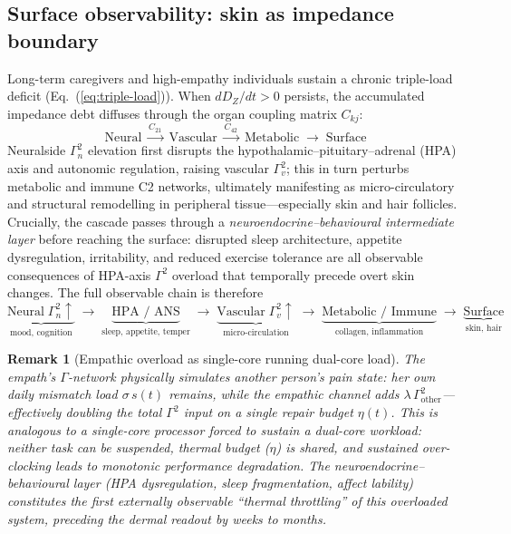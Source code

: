\documentclass[aps,pre,twocolumn,superscriptaddress,floatfix]{revtex4-2}
\newtheorem{remark}{Remark}
\begin{document}
\subsection{Surface observability: skin as impedance boundary}
\label{sec:surface-readout}

Long-term caregivers and high-empathy individuals
sustain a chronic triple-load deficit
(Eq.~(\ref{eq:triple-load})).
When $dD_Z/dt > 0$ persists, the accumulated
impedance debt diffuses through the organ coupling
matrix $C_{kj}$:
%
\[
  \text{Neural}
  \;\xrightarrow{C_{21}}\;
  \text{Vascular}
  \;\xrightarrow{C_{42}}\;
  \text{Metabolic}
  \;\to\;
  \text{Surface}
\]
%
Neuralside $\Gamma_n^2$ elevation first disrupts
the hypothalamic--pituitary--adrenal (HPA) axis
and autonomic regulation, raising vascular
$\Gamma_v^2$; this in turn perturbs metabolic
and immune C2 networks, ultimately manifesting
as micro-circulatory and structural remodelling
in peripheral tissue---especially skin and hair
follicles.
Crucially, the cascade passes through a
\emph{neuroendocrine--behavioural intermediate layer}
before reaching the surface:
disrupted sleep architecture, appetite dysregulation,
irritability, and reduced exercise tolerance are all
observable consequences of HPA-axis $\Gamma^2$
overload that temporally precede overt skin changes.
The full observable chain is therefore
%
\[
  \underbrace{\text{Neural}\;\Gamma_n^2\!\uparrow}
    _{\text{mood, cognition}}
  \;\to\;
  \underbrace{\text{HPA / ANS}}
    _{\text{sleep, appetite, temper}}
  \;\to\;
  \underbrace{\text{Vascular}\;\Gamma_v^2\!\uparrow}
    _{\text{micro-circulation}}
  \;\to\;
  \underbrace{\text{Metabolic / Immune}}
    _{\text{collagen, inflammation}}
  \;\to\;
  \underbrace{\text{Surface}}
    _{\text{skin, hair}}
\]
%

\begin{remark}[Empathic overload as single-core
running dual-core load]
\label{rem:single-core}
The empath's $\Gamma$-network physically simulates
another person's pain state:
her own daily mismatch load $\sigma\,s(t)$ remains,
while the empathic channel adds
$\lambda\,\Gamma^2_{\text{other}}$---effectively
doubling the total $\Gamma^2$ input on a single
repair budget $\eta(t)$.
This is analogous to a single-core processor forced
to sustain a dual-core workload:
neither task can be suspended, thermal budget
($\eta$) is shared, and sustained over-clocking
leads to monotonic performance degradation.
The neuroendocrine--behavioural layer
(HPA dysregulation, sleep fragmentation,
affect lability) constitutes the first
externally observable ``thermal throttling''
of this overloaded system,
preceding the dermal readout by weeks to months.
\end{remark}
\end{document}
